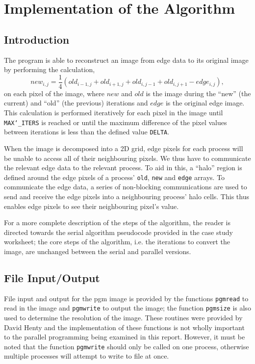 \documentclass[11pt, a4paper]{article}
\begin{document}
	\section{Implementation of the Algorithm}
		\subsection{Introduction}
			The program is able to reconstruct an image from edge data to its original image by performing the calculation, $$ new_{i, j} = \frac{1}{4}(old_{i-1, j} + old_{i+1, j} + old_{i, j-1} + old_{i, j+1} - edge_{i, j}),$$ on each pixel of the image, where $new$ and $old$ is the image during the ``new'' (the current) and ``old'' (the previous) iterations and $edge$ is the original edge image. This calculation is performed iteratively for each pixel in the image until \texttt{MAX\char`_ITERS} is reached or until the maximum difference of the pixel values between iterations is less than the defined value \texttt{DELTA}.
			
			When the image is decomposed into a 2D grid, edge pixels for each process will be unable to access all of their neighbouring pixels. We thus have to communicate the relevant edge data to the relevant process. To aid in this, a ``halo'' region is defined around the edge pixels of a process' \texttt{old}, \texttt{new} and \texttt{edge} arrays. To communicate the edge data, a series of non-blocking communications are used to send and receive the edge pixels into a neighbouring process' halo cells. This thus enables edge pixels to see their neighbouring pixel's value.
			
			For a more complete description of the steps of the algorithm, the reader is directed towards the serial algorithm pseudocode provided in the case study worksheet; the core steps of the algorithm, i.e. the iterations to convert the image, are unchanged between the serial and parallel versions.
		
		\subsection{File Input/Output}
			File input and output for the pgm image is provided by the functions \texttt{pgmread} to read in the image and \texttt{pgmwrite} to output the image; the  function \texttt{pgmsize} is also used to determine the resolution of the image. These routines were provided by David Henty and the implementation of these functions is not wholly important to the parallel programming being examined in this report. However, it must be noted that the function \texttt{pgmwrite} should only be called on one process, otherwise multiple processes will attempt to write to file at once.
			
\end{document}
